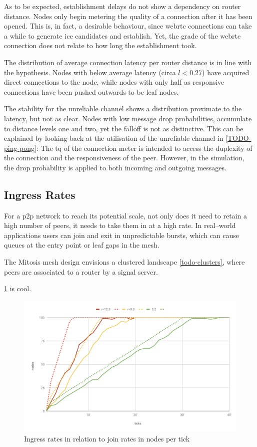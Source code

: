 As to be expected, establishment delays do not show a dependency on router distance. Nodes only begin metering the quality of a connection after it has been opened. This is, in fact, a desirable behaviour, since \gls{webrtc} connections can take a while to generate \gls{ice} candidates and establish. Yet, the grade of the \gls{webrtc} connection does not relate to how long the establishment took.

The distribution of average connection latency per router distance is in line with the hypothesis. Nodes with below average latency (circa $l<0.27$) have acquired direct connections to the \router node, while nodes with only half as responsive connections have been pushed outwards to be leaf nodes.

The stability for the unreliable channel shows a distribution proximate to the latency, but not as clear. Nodes with low message drop probabilities, accumulate to distance levels one and two, yet the falloff is not as distinctive. This can be explained by looking back at the utilisation of the unreliable channel in \vref{TODO-ping-pong}: The \gls{tq} of the connection meter is intended to access the duplexity of the connection and the responsiveness of the peer. However, in the simulation, the drop probability is applied to both incoming and outgoing messages.

\subsection{Ingress Rates}

For a \gls{p2p} network to reach its potential scale, not only does it need to retain a high number of peers, it needs to take them in at a high rate. In real–world applications users can join and exit in unpredictable bursts, which can cause queues at the entry point or leaf gaps in the mesh.

The Mitosis mesh design envisions a clustered landscape \vref{todo-clusters}, where peers are associated to a router by a signal server.

\cref{fig:ingress-rates} is cool.

\begin{figure}[htb!]
\centering
\includegraphics[width=1.0\textwidth]{graphics/analysis/ingress-final.pdf}
\caption{Ingress rates in relation to join rates in nodes per tick}
\label{fig:ingress-rates}
\end{figure}
